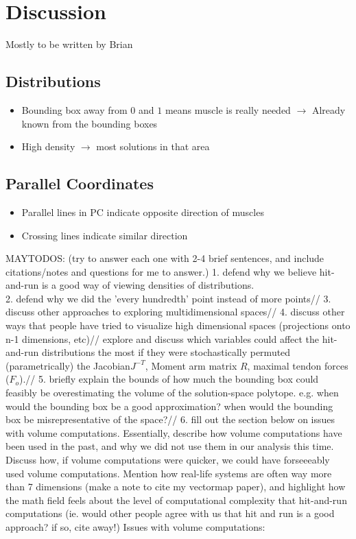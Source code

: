 \section{Discussion}
Mostly to be written by Brian
\subsection{Distributions}

\begin{itemize}
	\item Bounding box away from $0$ and $1$ means muscle is really needed $\rightarrow$ Already known from the bounding boxes
	\item High density $\rightarrow$ most solutions in that area
\end{itemize}

\subsection{Parallel Coordinates}
\begin{itemize}
	\item Parallel lines in PC indicate opposite direction of muscles
	\item Crossing lines indicate similar direction

\end{itemize}


MAYTODOS: (try to answer each one with 2-4 brief sentences, and include citations/notes and questions for me to answer.)
	1. defend why we believe hit-and-run is a good way of viewing densities of distributions.\\
	2. defend why we did the 'every hundredth' point instead of more points//
	3. discuss other approaches to exploring multidimensional spaces//
	4. discuss other ways that people have tried to visualize high dimensional spaces (projections onto n-1 dimensions, etc)//
	explore and discuss which variables could affect the hit-and-run distributions the most if they were stochastically permuted (parametrically) the Jacobian$J^{-T}$, Moment arm matrix $R$, maximal tendon forces ($F_o$).//
	5. briefly explain the bounds of how much the bounding box could feasibly be overestimating the volume of the solution-space polytope. e.g. when would the bounding box be a good approximation? when would the bounding box be misrepresentative of the space?//
	6. fill out the section below on issues with volume computations. Essentially, describe how volume computations have been used in the past, and why we did not use them in our analysis this time. Discuss how, if volume computations were quicker, we could have forseeeably used volume computations. Mention how real-life systems are often way more than 7 dimensions (make a note to cite my vectormap paper), and highlight how the math field feels about the level of computational complexity that hit-and-run computations (ie. would other people agree with us that hit and run is a good approach? if so, cite away!)
	Issues with volume computations:

